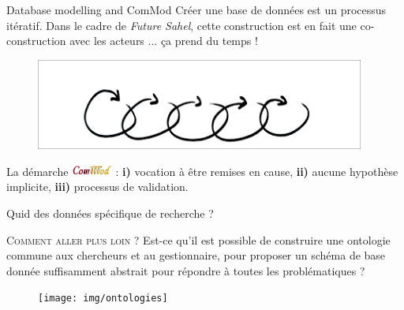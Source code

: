 \documentclass[newPxFont]{beamer}
\begin{document}
\begin{frame}[c]{Database modelling and ComMod}
\vspace{-2em}
Créer une base de données est un processus itératif. Dans le cadre de \textit{Future Sahel}, cette construction est en fait une co-construction avec les acteurs ... ça prend du temps !
\begin{figure}
	\centering
	\includegraphics[height = 3cm]{img/iteration}
\end{figure}
La démarche \includegraphics[height = 0.4cm]{img/logo_commod} : \textbf{i)} vocation à être remises en cause, \textbf{ii)} aucune hypothèse implicite, \textbf{iii)} processus de
validation.
\end{frame}

\begin{frame}[c]{Quid des données spécifique de recherche ?}
\vspace{-2em}
\begin{block}{\textsc{Comment aller plus loin ?}}
  Est-ce qu'il est possible de construire une ontologie commune aux chercheurs et au gestionnaire, pour proposer un schéma de base donnée suffisamment abstrait pour répondre à toutes les problématiques ?
\end{block}
\begin{figure}
	\centering
	\texttt{[image: img/ontologies]}
\end{figure}
\end{frame}
\end{document}
